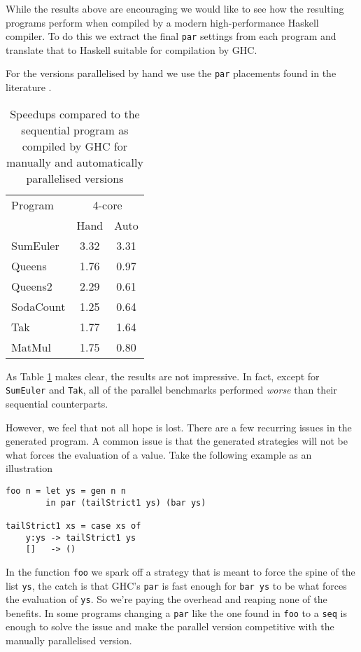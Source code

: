 While the results above are encouraging we would like to see how the resulting
programs perform when compiled by a modern high-performance Haskell compiler.
To do this we extract the final \verb-par- settings from each program and
translate that to Haskell suitable for compilation by GHC.

For the versions parallelised by hand we use the \verb-par- placements found
in the literature \citep{vGMachine, runciman1994profiling}.

\begin{table}[ht]
\caption[Naive transfer to GHC]{Speedups compared to the sequential program as compiled by GHC for
         manually and automatically parallelised versions}
\centering
\smallskip
  \begin{tabular}{ l||c c }
    Program & \multicolumn{2}{c}{4-core} \\
            & Hand   & Auto         \\
    \hline
    SumEuler  & 3.32    & 3.31      \\
    Queens    & 1.76    & 0.97      \\
    Queens2   & 2.29    & 0.61     \\
    SodaCount & 1.25    & 0.64      \\
    Tak       & 1.77    & 1.64      \\
    MatMul    & 1.75    & 0.80      \\
  \end{tabular}
\label{tableGHC}
\end{table}

As Table \ref{tableGHC} makes clear, the results are not impressive. In fact,
except for \verb-SumEuler- and \verb-Tak-, all of the parallel benchmarks
performed \emph{worse} than their sequential counterparts.

However, we feel that not all hope is lost. There are a few recurring issues in
the generated program. A common issue is that the generated strategies will not
be what forces the evaluation of a value. Take the following example as an
illustration

\begin{verbatim}
foo n = let ys = gen n n
        in par (tailStrict1 ys) (bar ys)

tailStrict1 xs = case xs of
    y:ys -> tailStrict1 ys
    []   -> ()
\end{verbatim}

In the function \verb-foo- we spark off a strategy that is meant to force the
spine of the list \verb-ys-, the catch is that GHC's \verb-par- is fast enough
for \verb-bar ys- to be what forces the evaluation of \verb-ys-. So we're
paying the overhead and reaping none of the benefits. In some programs changing
a \verb-par- like the one found in \verb-foo- to a \verb-seq- is enough to solve the
issue and make the parallel version competitive with the manually parallelised version.
